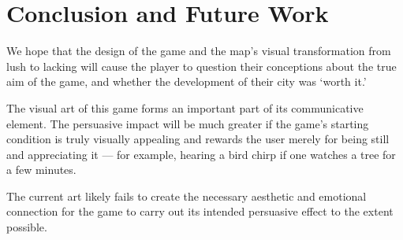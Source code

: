 \documentclass[12pt]{article}
\begin{document}
	\section{Conclusion and Future Work}

		We hope that the design of the game and the map’s visual transformation
		from lush to lacking will cause the player to question their
		conceptions about the true aim of the game, and whether the development
		of their city was ‘worth it.’

		The visual art of this game forms an important part of its
		communicative element. The persuasive impact will be much greater if
		the game’s starting condition is truly visually appealing and rewards
		the user merely for being still and appreciating it --- for example,
		hearing a bird chirp if one watches a tree for a few minutes.

		The current art likely fails to create the necessary aesthetic and
		emotional connection for the game to carry out its intended persuasive
		effect to the extent possible.
	 
\end{document}
